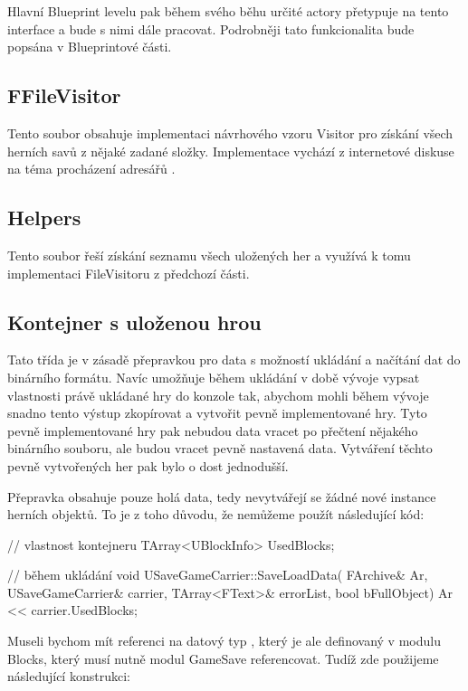 Hlavní Blueprint levelu pak během svého běhu určité actory přetypuje na tento interface a bude s nimi dále pracovat. Podrobněji tato funkcionalita bude popsána v Blueprintové části.

\subsection{FFileVisitor}


Tento soubor obsahuje implementaci návrhového vzoru Visitor pro získání všech herních savů z nějaké zadané složky. Implementace vychází z internetové diskuse na téma procházení adresářů \citep{ue_iterate_dir}.

\subsection{Helpers}

Tento soubor řeší získání seznamu všech uložených her a využívá k tomu implementaci FileVisitoru z předchozí části.

\subsection{Kontejner s uloženou hrou}
 Tato třída je v zásadě přepravkou pro data s možností ukládání a načítání dat do binárního formátu. Navíc umožňuje během ukládání v době vývoje vypsat vlastnosti právě ukládané hry do konzole tak, abychom mohli během vývoje snadno tento výstup zkopírovat a vytvořit pevně implementované hry. Tyto pevně implementované hry pak nebudou data vracet po přečtení nějakého binárního souboru, ale budou vracet pevně nastavená data. Vytváření těchto pevně vytvořených her pak bylo o dost jednodušší.

Přepravka obsahuje pouze holá data, tedy nevytvářejí se žádné nové instance herních objektů. To je z toho důvodu, že nemůžeme použít následující kód:

\begin{code}

// vlastnost kontejneru
TArray<UBlockInfo> UsedBlocks;

// během ukládání
void USaveGameCarrier::SaveLoadData(
	FArchive& Ar,
	USaveGameCarrier& carrier,
	TArray<FText>& errorList,
	bool bFullObject)
{
	Ar << carrier.UsedBlocks;
}
\end{code}
Museli bychom mít referenci na datový typ , který je ale definovaný v modulu Blocks, který musí nutně modul GameSave referencovat. Tudíž zde použijeme následující konstrukci:


